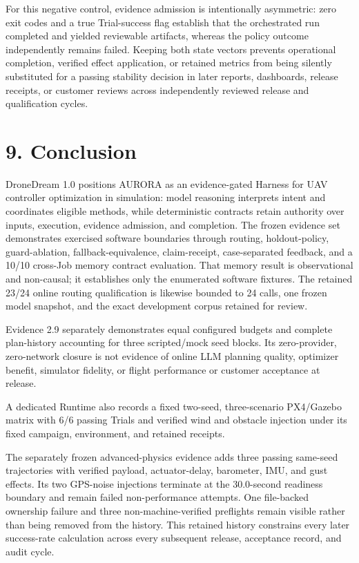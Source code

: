 For this negative control, evidence admission is intentionally asymmetric:
zero exit codes and a true Trial-success flag establish that the
orchestrated run completed and yielded reviewable artifacts, whereas the
policy outcome independently remains failed. Keeping both state vectors
prevents operational completion, verified effect application, or retained
metrics from being silently substituted for a passing stability decision
in later reports, dashboards, release receipts, or customer reviews across
independently reviewed release and qualification cycles.

\section{\texorpdfstring{\textbf{9.
Conclusion}}{9. Conclusion}}\label{conclusion}

DroneDream 1.0 positions AURORA as an evidence-gated Harness for UAV
controller optimization in simulation: model reasoning interprets intent
and coordinates eligible methods, while deterministic contracts retain
authority over inputs, execution, evidence admission, and completion.
The frozen evidence set demonstrates exercised software boundaries through
routing, holdout-policy, guard-ablation, fallback-equivalence,
claim-receipt, case-separated feedback, and a 10/10 cross-Job memory
contract evaluation. That memory result is observational and
non-causal; it establishes only the enumerated software fixtures. The
retained 23/24 online routing qualification is likewise bounded to 24
calls, one frozen model snapshot, and the exact development corpus
retained for review.

Evidence 2.9 separately demonstrates equal configured budgets and
complete plan-history accounting for three scripted/mock seed blocks. Its
zero-provider, zero-network closure is not evidence of online LLM
planning quality, optimizer benefit, simulator fidelity, or flight
performance or customer acceptance at release.

A dedicated Runtime
also records a fixed two-seed, three-scenario PX4/Gazebo matrix with 6/6
passing Trials and verified wind and obstacle injection under its fixed
campaign, environment, and retained receipts.

The separately frozen advanced-physics evidence adds three passing
same-seed trajectories with verified payload, actuator-delay, barometer,
IMU, and gust effects. Its two GPS-noise injections terminate at the
30.0-second readiness boundary and remain failed non-performance
attempts. One file-backed ownership failure and three non-machine-verified
preflights remain visible rather than being removed from the history. This
retained history constrains every later success-rate calculation across
every subsequent release, acceptance record, and audit cycle.

